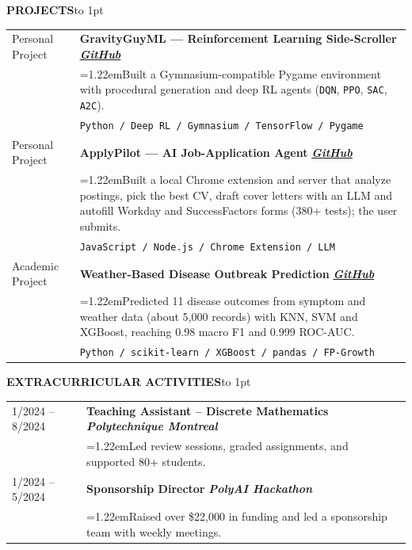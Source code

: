 \documentclass[a4paper,10pt]{article}
\newcommand{\sechead}[1]{\vspace{0.5em}\noindent\textbf{\large #1}\hspace{0.8em}\leaders\hbox to 1pt{\hss\raisebox{0.3em}{\rule{1pt}{0.4pt}}\hss}\hfill\null\par\vspace{0.45em}}
\newcommand{\bul}{\hangindent=1.22em\hangafter=1\hspace{0.5em}\textbullet\hspace{0.4em}}
\begin{document}
\vspace{0.2em}
\sechead{PROJECTS}

\begin{tabularx}{\textwidth}{@{}p{3cm} X@{}}
    Personal Project & \textbf{GravityGuyML — Reinforcement Learning Side-Scroller} \hfill \textbf{\textit{\href{https://github.com/Mbaka11/Gravity-Guy-ML}{GitHub}}} \\
    & \bul Built a Gymnasium-compatible Pygame environment with procedural generation and deep RL agents (\texttt{DQN}, \texttt{PPO}, \texttt{SAC}, \texttt{A2C}). \\
    & \texttt{Python / Deep RL / Gymnasium / TensorFlow / Pygame} \\[0.5em]

    Personal Project & \textbf{ApplyPilot — AI Job-Application Agent} \hfill \textbf{\textit{\href{https://github.com/Mbaka11/ApplyPilot}{GitHub}}} \\
    & \bul Built a local Chrome extension and server that analyze postings, pick the best CV, draft cover letters with an LLM and autofill Workday and SuccessFactors forms (380+ tests); the user submits. \\
    & \texttt{JavaScript / Node.js / Chrome Extension / LLM} \\[0.5em]

    Academic Project & \textbf{Weather-Based Disease Outbreak Prediction} \hfill \textbf{\textit{\href{https://github.com/Mbaka11/20251R0136COSE47101}{GitHub}}} \\
    & \bul Predicted 11 disease outcomes from symptom and weather data (about 5,000 records) with KNN, SVM and XGBoost, reaching 0.98 macro F1 and 0.999 ROC-AUC. \\
    & \texttt{Python / scikit-learn / XGBoost / pandas / FP-Growth} \\[0.5em]
\end{tabularx}

\vspace{0.2em}
\sechead{EXTRACURRICULAR ACTIVITIES}

\begin{tabularx}{\textwidth}{@{}p{3cm} X@{}}
    1/2024 -- 8/2024 & \textbf{Teaching Assistant -- Discrete Mathematics} \hfill \textbf{\textit{Polytechnique Montreal}} \\
    & \bul Led review sessions, graded assignments, and supported 80+ students. \\[0.5em]

    1/2024 -- 5/2024 & \textbf{Sponsorship Director} \hfill \textbf{\textit{PolyAI Hackathon}} \\
    & \bul Raised over \$22,000 in funding and led a sponsorship team with weekly meetings. \\
\end{tabularx}
\end{document}
